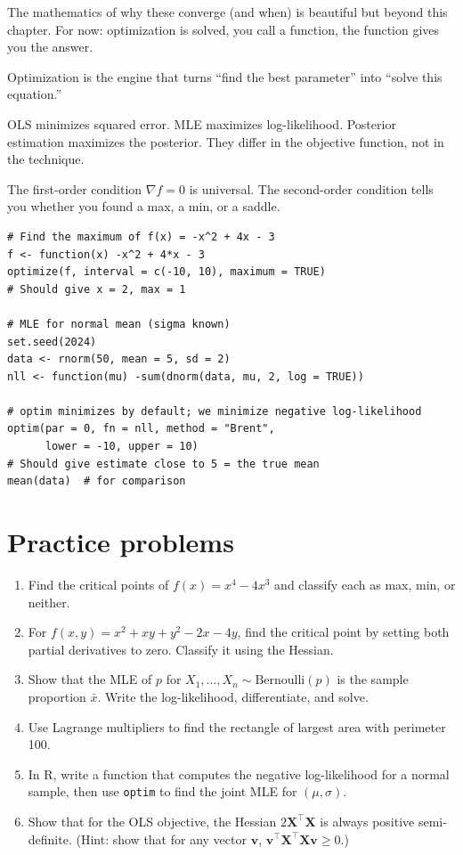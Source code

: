 The mathematics of why these converge (and when) is beautiful but beyond this chapter. For now: optimization is solved, you call a function, the function gives you the answer.

\begin{keyinsight}
Optimization is the engine that turns ``find the best parameter'' into ``solve this equation.''

OLS minimizes squared error. MLE maximizes log-likelihood. Posterior estimation maximizes the posterior. They differ in the objective function, not in the technique.

The first-order condition $\nabla f = 0$ is universal. The second-order condition tells you whether you found a max, a min, or a saddle.
\end{keyinsight}

\begin{codelab}
\begin{lstlisting}[language=Rlang]
# Find the maximum of f(x) = -x^2 + 4x - 3
f <- function(x) -x^2 + 4*x - 3
optimize(f, interval = c(-10, 10), maximum = TRUE)
# Should give x = 2, max = 1

# MLE for normal mean (sigma known)
set.seed(2024)
data <- rnorm(50, mean = 5, sd = 2)
nll <- function(mu) -sum(dnorm(data, mu, 2, log = TRUE))

# optim minimizes by default; we minimize negative log-likelihood
optim(par = 0, fn = nll, method = "Brent",
      lower = -10, upper = 10)
# Should give estimate close to 5 = the true mean
mean(data)  # for comparison
\end{lstlisting}
\end{codelab}

\section{Practice problems}

\begin{enumerate}
  \item Find the critical points of $f(x) = x^4 - 4x^3$ and classify each as max, min, or neither.
  \item For $f(x, y) = x^2 + xy + y^2 - 2x - 4y$, find the critical point by setting both partial derivatives to zero. Classify it using the Hessian.
  \item Show that the MLE of $p$ for $X_1, \ldots, X_n \sim \text{Bernoulli}(p)$ is the sample proportion $\bar{x}$. Write the log-likelihood, differentiate, and solve.
  \item Use Lagrange multipliers to find the rectangle of largest area with perimeter 100.
  \item In R, write a function that computes the negative log-likelihood for a normal sample, then use \texttt{optim} to find the joint MLE for $(\mu, \sigma)$.
  \item Show that for the OLS objective, the Hessian $2\bm{X}^\top \bm{X}$ is always positive semi-definite. (Hint: show that for any vector $\bm{v}$, $\bm{v}^\top \bm{X}^\top \bm{X} \bm{v} \geq 0$.)
\end{enumerate}

